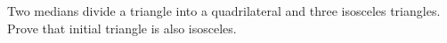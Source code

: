 \problem{}
Two medians divide a triangle into a quadrilateral and three isosceles triangles.
Prove that initial triangle is also isosceles.
\solution
\endproblem
